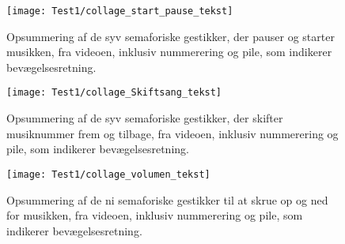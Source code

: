 %
\begin{figure}[H]
	\centering
	\texttt{[image: Test1/collage\_start\_pause\_tekst]}
	\caption{Opsummering af de syv semaforiske gestikker, der pauser og starter musikken, fra videoen, inklusiv nummerering og pile, som indikerer bevægelsesretning.}
	\label{fig:OversigtPauseStart}
\end{figure}
\noindent
%
%
\begin{figure}[H]
	\centering
	\texttt{[image: Test1/collage\_Skiftsang\_tekst]}
	\caption{Opsummering af de syv semaforiske gestikker, der skifter musiknummer frem og tilbage, fra videoen, inklusiv nummerering og pile, som indikerer bevægelsesretning.}
	\label{fig:OversigtSkift}
\end{figure}
\noindent
%
%
\begin{figure}[H]
	\centering
	\texttt{[image: Test1/collage\_volumen\_tekst]}
	\caption{Opsummering af de ni semaforiske gestikker til at skrue op og ned for musikken, fra videoen, inklusiv nummerering og pile, som indikerer bevægelsesretning.}
	\label{fig:OversigtVolumen}
\end{figure}
\noindent
%
